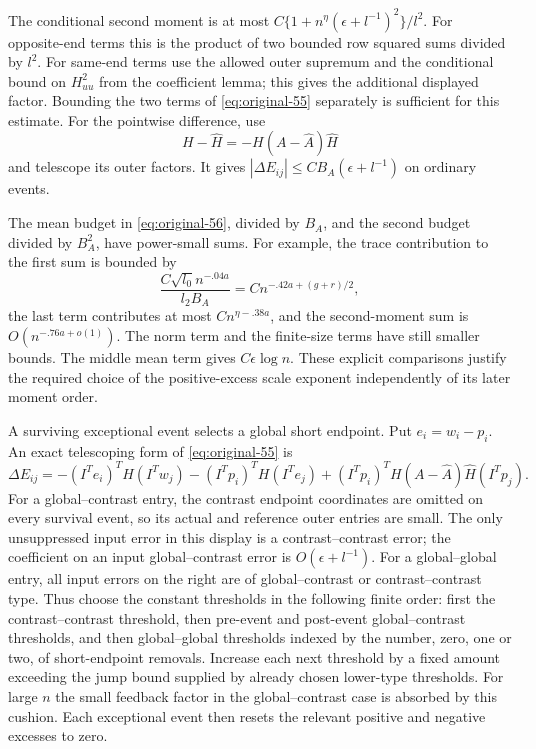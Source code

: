 The conditional second moment is at most
$C\{1+n^\eta(\epsilon+l^{-1})^2\}/l^2$.
For opposite-end terms this is the product of two bounded row
squared sums divided by $l^2$.
For same-end terms use the allowed outer supremum and the
conditional bound on $H_{uu}^2$ from the coefficient lemma; this
gives the additional displayed factor.  Bounding the two terms of
\eqref{eq:original-55} separately is sufficient for this estimate.
For the pointwise difference, use
\[
 H-\widehat H=-H(A-\widehat A)\widehat H
\]
and telescope its outer factors.  It gives
$|\Delta E_{ij}|\le CB_A(\epsilon+l^{-1})$ on ordinary events.

The mean budget in \eqref{eq:original-56}, divided by $B_A$, and
the second budget divided by $B_A^2$, have power-small sums.
For example, the trace contribution to the first sum is bounded by
\[
 \frac{C\sqrt{l_0}n^{-.04a}}{l_2B_A}
   =Cn^{-.42a+(g+r)/2},
\]
the last term contributes at most $Cn^{\eta-.38a}$, and the
second-moment sum is $O(n^{-.76a+o(1)})$.
The norm term and the finite-size terms have still smaller bounds.
The middle mean term gives $C\epsilon\log n$.
These explicit comparisons justify the required choice of the
positive-excess scale exponent independently of its later moment
order.

A surviving exceptional event selects a global short endpoint.  Put $e_i=w_i-p_i$.
An exact telescoping form of \eqref{eq:original-55} is
\[
 \Delta E_{ij}
 =-(I^Te_i)^TH(I^Tw_j)
  -(I^Tp_i)^TH(I^Te_j)
  +(I^Tp_i)^TH(A-\widehat A)\widehat H(I^Tp_j).
\]
For a global--contrast entry, the contrast endpoint coordinates
are omitted on every survival event, so its actual and reference
outer entries are small.  The only unsuppressed input error in
this display is a contrast--contrast error; the coefficient on an
input global--contrast error is $O(\epsilon+l^{-1})$.
For a global--global entry, all input errors on the right are of
global--contrast or contrast--contrast type.  Thus choose the
constant thresholds in the following finite order: first the
contrast--contrast threshold, then pre-event and post-event
global--contrast thresholds, and then global--global thresholds
indexed by the number, zero, one or two, of short-endpoint removals.
Increase each next threshold by a fixed amount exceeding the jump
bound supplied by already chosen lower-type thresholds.  For large
$n$ the small feedback factor in the global--contrast case is
absorbed by this cushion.  Each exceptional event then resets the
relevant positive and negative excesses to zero.

